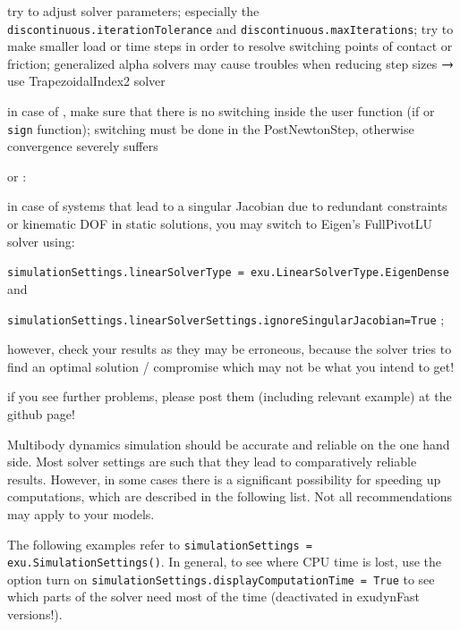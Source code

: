   \bi
  \item[$\ra$] try to adjust solver parameters; especially the \texttt{discontinuous.iterationTolerance} and \texttt{discontinuous.maxIterations}; try to make smaller load or time steps in order to resolve switching points of contact or friction; generalized alpha solvers may cause troubles when reducing step sizes $\ra$ use TrapezoidalIndex2 solver
  \item[$\ra$] in case of , make sure that there is no switching inside the user function (if or \texttt{sign} function); switching must be done in the PostNewtonStep, otherwise convergence severely suffers
  \ei
  \item {} or :
  \bi
  \item[$\ra$] in case of systems that lead to a singular Jacobian due to redundant constraints or kinematic DOF in static solutions, you may switch to Eigen's FullPivotLU solver using:
  \item[$\ra$] \texttt{simulationSettings.linearSolverType = exu.LinearSolverType.EigenDense} and 
  \item[$\ra$] \texttt{simulationSettings.linearSolverSettings.ignoreSingularJacobian=True} ;
  \item[$\ra$] however, check your results as they may be erroneous, because the solver tries to find an optimal solution / compromise which may not be what you intend to get!
  \ei
  \item if you see further problems, please post them (including relevant example) at the \codeName github page!
\ei

%
Multibody dynamics simulation should be accurate and reliable on the one hand side. Most solver settings are such that they lead to comparatively reliable results.
However, in some cases there is a significant possibility for speeding up computations, which are described in the following list. Not all recommendations may apply to your models.

The following examples refer to \texttt{simulationSettings = exu.SimulationSettings()}.
In general, to see where CPU time is lost, use the option turn on \texttt{simulationSettings.displayComputationTime = True} to see which parts of the solver need most of the time (deactivated in exudynFast versions!).

